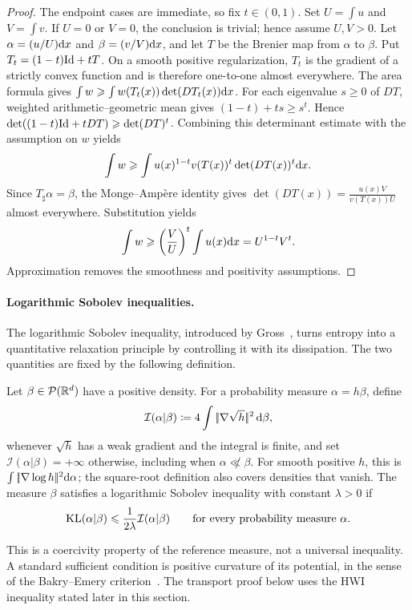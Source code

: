 \begin{proof}
	The endpoint cases are immediate, so fix $t\in(0,1)$. Set $U=\int u$ and $V=\int v$. If $U=0$ or $V=0$, the conclusion is trivial; hence assume $U,V>0$. Let $\alpha=(u/U)\mathrm{d} x$ and $\beta=(v/V)\mathrm{d} x$, and let $T$ be the Brenier map from $\alpha$ to $\beta$. Put $T_t=(1-t)\mathrm{Id}+tT$. On a smooth positive regularization, $T_t$ is the gradient of a strictly convex function and is therefore one-to-one almost everywhere. The area formula gives
	\(\int w \geqslant \int w(T_t(x))\det(DT_t(x))\mathrm{d} x\).
	For each eigenvalue $s\geq0$ of $DT$, weighted arithmetic--geometric mean gives $(1-t)+ts\geq s^t$. Hence
	\(\det((1-t)\mathrm{Id}+tDT)\geqslant\det(DT)^t\).
	Combining this determinant estimate with the assumption on $w$ yields
	\[
		\int w
		\geqslant
		\int u(x)^{1-t}v(T(x))^t\det(DT(x))^t\mathrm{d} x.
	\]
	Since $T_\sharp\alpha=\beta$, the Monge--Amp\`ere identity gives
	\(\det(DT(x))=\frac{u(x)V}{v(T(x))U}\)
	almost everywhere. Substitution yields
	\[
		\int w
		\geqslant
		\left(\frac{V}{U}\right)^t\int u(x)\mathrm{d} x
		=
		U^{1-t}V^t.
	\]
	Approximation removes the smoothness and positivity assumptions.
\end{proof}


\paragraph{Logarithmic Sobolev inequalities.}
The logarithmic Sobolev inequality, introduced by Gross~\cite{Gross1975LogSobolev}, turns entropy into a quantitative relaxation principle by controlling it with its dissipation. The two quantities are fixed by the following definition.
\begin{defn}\label{def-relative-fisher-lsi}
Let \(\beta\in\mathcal{P}(\mathbb{R}^d)\) have a positive density. For a probability measure \(\alpha=h\beta\), define
\begin{equation}\label{eq-relative-fisher-information}
	\mathcal I(\alpha|\beta)
	\coloneqq
	4\int |\!| \nabla\sqrt h |\!|^2\,\mathrm{d}\beta,
\end{equation}
whenever $\sqrt h$ has a weak gradient and the integral is finite, and set \(\mathcal I(\alpha|\beta)=+\infty\) otherwise, including when \(\alpha\not\ll\beta\). For smooth positive $h$, this is $\int|\!| \nabla\log h |\!|^2\mathrm{d}\alpha$; the square-root definition also covers densities that vanish. The measure \(\beta\) satisfies a logarithmic Sobolev inequality with constant \(\lambda>0\) if
\begin{equation}\label{eq-general-log-sobolev}
	\operatorname{KL}(\alpha|\beta)
	\leqslant
	\frac{1}{2\lambda}\mathcal I(\alpha|\beta)
	\qquad
	\text{for every probability measure }\alpha.
\end{equation}
\end{defn}
This is a coercivity property of the reference measure, not a universal inequality. A standard sufficient condition is positive curvature of its potential, in the sense of the Bakry--Emery criterion~\cite{BakryEmery1985Diffusions,BakryGentilLedoux2014Markov}. The transport proof below uses the HWI inequality stated later in this section.

